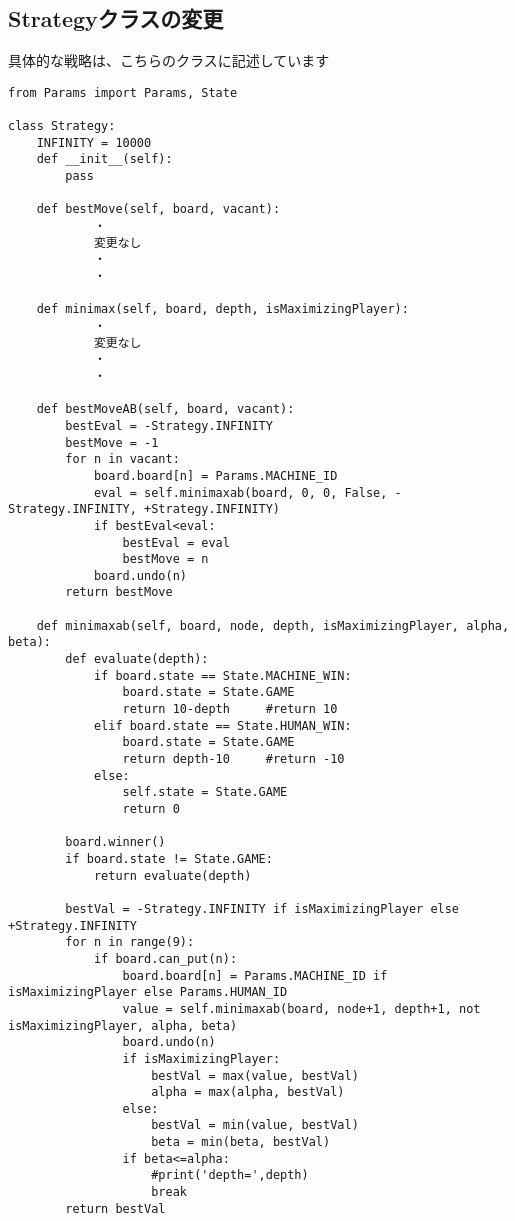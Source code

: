 \documentclass[uplatex,a4paper,11pt,oneside,openany]{jsbook}
\begin{document}
\subsection{Strategyクラスの変更}

具体的な戦略は、こちらのクラスに記述しています

\begin{lstlisting}[caption=class Strategy,label=minimax00]
from Params import Params, State

class Strategy:
    INFINITY = 10000
    def __init__(self):
        pass

    def bestMove(self, board, vacant):
            ・
            変更なし
            ・
            ・

    def minimax(self, board, depth, isMaximizingPlayer):
            ・
            変更なし
            ・
            ・

    def bestMoveAB(self, board, vacant):
        bestEval = -Strategy.INFINITY
        bestMove = -1
        for n in vacant:
            board.board[n] = Params.MACHINE_ID
            eval = self.minimaxab(board, 0, 0, False, -Strategy.INFINITY, +Strategy.INFINITY)
            if bestEval<eval:
                bestEval = eval
                bestMove = n
            board.undo(n)
        return bestMove

    def minimaxab(self, board, node, depth, isMaximizingPlayer, alpha, beta):
        def evaluate(depth):
            if board.state == State.MACHINE_WIN:
                board.state = State.GAME
                return 10-depth     #return 10
            elif board.state == State.HUMAN_WIN:
                board.state = State.GAME
                return depth-10     #return -10
            else:
                self.state = State.GAME
                return 0

        board.winner()
        if board.state != State.GAME:
            return evaluate(depth)

        bestVal = -Strategy.INFINITY if isMaximizingPlayer else +Strategy.INFINITY
        for n in range(9):
            if board.can_put(n):
                board.board[n] = Params.MACHINE_ID if isMaximizingPlayer else Params.HUMAN_ID
                value = self.minimaxab(board, node+1, depth+1, not isMaximizingPlayer, alpha, beta)
                board.undo(n)
                if isMaximizingPlayer:
                    bestVal = max(value, bestVal)
                    alpha = max(alpha, bestVal)
                else:
                    bestVal = min(value, bestVal)
                    beta = min(beta, bestVal)
                if beta<=alpha:
                    #print('depth=',depth)
                    break
        return bestVal
\end{lstlisting}




%
\begin{thebibliography}{99}
\end{thebibliography}
%
\end{document}
